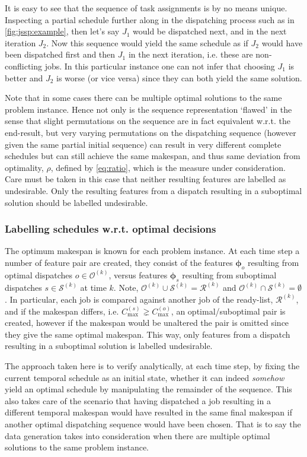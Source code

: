 \documentclass[smallextended]{svjour3}
\renewcommand{\vphi}{\bm \phi}
\begin{document}
	It is easy to see that the sequence of task assignments is by no means unique. Inspecting a partial schedule further along in the dispatching process such as in \cref{fig:jssp:example}, then let's say $J_1$ would be dispatched next, and in the next iteration $J_2$. Now this sequence would yield the same schedule as if $J_2$ would have been dispatched first and then $J_1$ in the next iteration, i.e. these are non-conflicting jobs. 
	In this particular instance one can not infer that choosing $J_1$ is better and $J_2$ is worse (or vice versa) since they can both yield the same solution.
	
	Note that in some cases there can be multiple optimal solutions to the same problem instance. Hence not only is the sequence representation `flawed' in the sense that slight permutations on the sequence are in fact equivalent w.r.t. the end-result, but very varying permutations on the dispatching sequence (however given the same partial initial sequence) can result in very different complete schedules but can still achieve the same makespan, and thus same deviation from optimality, $\rho$, defined by \eqref{eq:ratio}, which is the measure under consideration. Care must be taken in this case that neither resulting features are labelled as undesirable. Only the resulting features from a dispatch resulting in a suboptimal solution should be labelled undesirable. 
	
	\subsubsection{Labelling schedules w.r.t. optimal decisions}
	The optimum makespan is known for each problem instance. 
	At each time step a number of feature pair are created, they consist of the features $\vphi_o$ resulting from optimal dispatches $o\in\mathcal{O}^{(k)}$, versus features $\vphi_s$ resulting from suboptimal dispatches $s\in\mathcal{S}^{(k)}$ at time $k$. Note, $\mathcal{O}^{(k)}\cup\mathcal{S}^{(k)}=\mathcal{R}^{(k)}$ and $\mathcal{O}^{(k)}\cap\mathcal{S}^{(k)}=\emptyset$.
	In particular, each job is compared against another job of the ready-list, $\mathcal{R}^{(k)}$, and if the makespan differs, i.e. $C_{\max}^{(s)}\gneq C_{\max}^{(o)}$, an optimal/suboptimal pair is created, however if the makespan would be unaltered the pair is omitted since they give the same optimal makespan. This way, only features from a dispatch resulting in a suboptimal solution is labelled undesirable.
	
	The approach taken here is to verify analytically, at each time step, by fixing the current temporal schedule as an initial state, whether it can indeed \emph{somehow} yield an optimal schedule by manipulating the remainder of the sequence. This also takes care of the scenario that having dispatched a job resulting in a different temporal makespan would have resulted in the same final makespan if another optimal dispatching sequence would have been chosen. That is to say the data generation takes into consideration when there are multiple optimal solutions to the same problem instance. 
	
\end{document}
